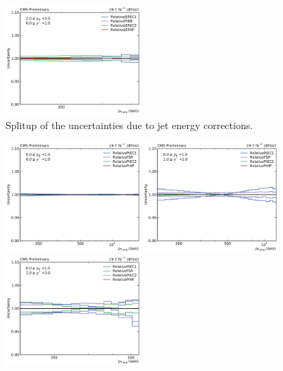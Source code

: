 \begin{figure}[htbp]
    \includegraphics[width=0.45\textwidth]{figures/measurement/jec_relunc_2_yb2ys0.pdf}
    \caption{Splitup of the uncertainties due to jet energy corrections.}
    \label{fig:jec_relunc_2}
\end{figure}


\begin{figure}[htbp]
    \centering
    \includegraphics[width=0.45\textwidth]{figures/measurement/jec_relunc_3_yb0ys0.pdf}\hfill
    \includegraphics[width=0.45\textwidth]{figures/measurement/jec_relunc_3_yb0ys1.pdf}
    \includegraphics[width=0.45\textwidth]{figures/measurement/jec_relunc_3_yb0ys2.pdf}\hfill

\end{figure}
